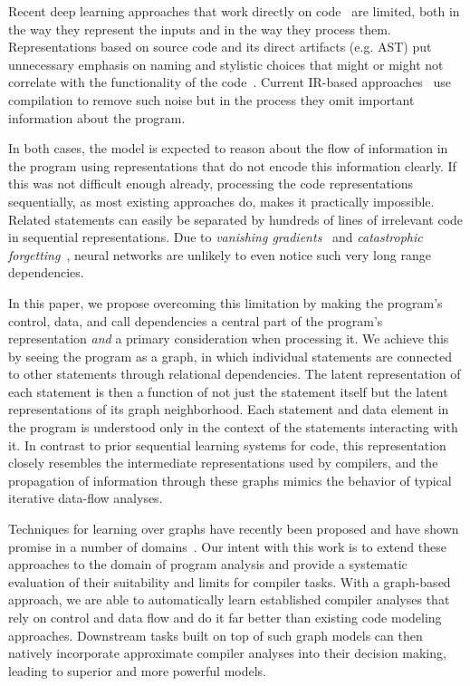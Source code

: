 Recent deep learning approaches that work directly on
code~\cite{Allamanis2017a} are limited, both in the way they represent
the inputs and in the way they process them. Representations based on
source code and its direct artifacts (e.g. AST) put unnecessary
emphasis on naming and stylistic choices that might or might not
correlate with the functionality of the
code~\cite{Alon2018a,Yin2018,Haj-Ali2019a}. Current IR-based
approaches~\cite{Ben-nun2018,Mirhoseini2017,Brauckmann2020} use
compilation to remove such noise but in the process they omit
important information about the program.

In both cases, the model is expected to reason about the flow of
information in the program using representations that do not encode
this information clearly. If this was not difficult enough already,
processing the code representations sequentially, as most existing
approaches do, makes it practically impossible. Related statements can
easily be separated by hundreds of lines of irrelevant code in
sequential representations. Due to \textit{vanishing
  gradients}~\cite{Bengio1994} and \textit{catastrophic
  forgetting}~\cite{McCloskey1989}, neural networks are unlikely to
even notice such very long range dependencies.

In this paper, we propose overcoming this limitation by making the
program's control, data, and call dependencies a central part of the
program's representation \emph{and} a primary consideration when
processing it. We achieve this by seeing the program as a graph, in
which individual statements are connected to other statements through
relational dependencies. The latent representation of each statement
is then a function of not just the statement itself but the latent
representations of its graph neighborhood. Each statement and data
element in the program is understood only in the context of the
statements interacting with it. In contrast to prior sequential
learning systems for code, this representation closely resembles the
intermediate representations used by compilers, and the propagation of
information through these graphs mimics the behavior of typical
iterative data-flow analyses.

Techniques for learning over graphs have recently been proposed and
have shown promise in a number of
domains~\cite{Li2015a,Schlichtkrull2018a,Gilmer2017}. Our intent with
this work is to extend these approaches to the domain of program
analysis and provide a systematic evaluation of their suitability and
limits for compiler tasks. With a graph-based approach, we are able to
automatically learn established compiler analyses that rely on control
and data flow and do it far better than existing code modeling
approaches. Downstream tasks built on top of such graph models can
then natively incorporate approximate compiler analyses into their
decision making, leading to superior and more powerful models.

